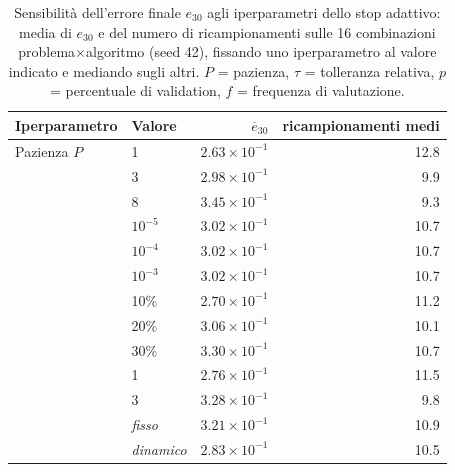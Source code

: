 \begin{table}[H]
\centering
\footnotesize
\renewcommand{\arraystretch}{1.15}
\setlength{\tabcolsep}{5pt}
\caption{Sensibilità dell'errore finale $e_{30}$ agli iperparametri dello stop adattivo: media di $e_{30}$ e del numero di ricampionamenti sulle 16 combinazioni problema$\times$algoritmo (seed 42), fissando uno iperparametro al valore indicato e mediando sugli altri. $P$ = pazienza, $\tau$ = tolleranza relativa, $p$ = percentuale di validation, $f$ = frequenza di valutazione.}
\label{tab:riuso_valid_iper}
\begin{tabular}{@{}llrr@{}}
\toprule
Iperparametro & Valore & $\overline{e}_{30}$ & ricampionamenti medi\\
\midrule
Pazienza $P$ & 1 & $2.63\times10^{-1}$ & 12.8\\
 & 3 & $2.98\times10^{-1}$ & 9.9\\
 & 8 & $3.45\times10^{-1}$ & 9.3\\
\midrule
 & $10^{-5}$ & $3.02\times10^{-1}$ & 10.7\\
 & $10^{-4}$ & $3.02\times10^{-1}$ & 10.7\\
 & $10^{-3}$ & $3.02\times10^{-1}$ & 10.7\\
\midrule
 & 10\% & $2.70\times10^{-1}$ & 11.2\\
 & 20\% & $3.06\times10^{-1}$ & 10.1\\
 & 30\% & $3.30\times10^{-1}$ & 10.7\\
\midrule
 & 1 & $2.76\times10^{-1}$ & 11.5\\
 & 3 & $3.28\times10^{-1}$ & 9.8\\
\midrule
 & \emph{fisso} & $3.21\times10^{-1}$ & 10.9\\
 & \emph{dinamico} & $2.83\times10^{-1}$ & 10.5\\
\midrule
\bottomrule
\end{tabular}
\end{table}

